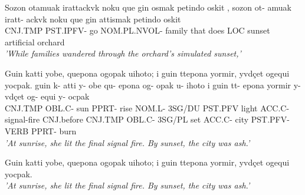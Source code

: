 \documentclass[11pt]{article}
\begin{document}
\begin{exe}
  \ex \label{ex:catwindow}
  Sozon otamuak irattackvk noku que gin osmak petindo oskit ,
  \gll
  sozon    ot-       amuak iratt-      ackvk  noku que  gin attismak  petindo    oskit\\
  CNJ.TMP PST.IPFV- go    NOM.PL.NVOL- family that does LOC sunset artificial orchard\\
  \trans
    \textit{'While families wandered through the orchard’s simulated sunset,'}\\
\end{exe}

\begin{exe}
  \ex \label{ex:warI}
  Guin katti yobe, quepona ogopak uihoto; i guin ttepona yormir, yvdçet ogequi yocpak.
  \gll
  guin    k-     atti y-    obe qu-    epona  og-     opak u-   ihoto       i          
  guin    tt-    epona  yormir y-     vdçet og-      equi y-    ocpak\\
  CNJ.TMP OBL.C- sun  PPRT- rise NOM.L- 3SG/DU PST.PFV light ACC.C- signal-fire CNJ.before 
  CNJ.TMP OBL.C- 3SG/PL set    ACC.C- city  PST.PFV- VERB PPRT- burn\\
  \trans
    \textit{'At sunrise, she lit the final signal fire. By sunset, the city was ash.'}\\
\end{exe}

\begin{exe}
  \ex \label{ex:warI-beau}
  \Huge{}Guin katti yobe, quepona ogopak uihoto; i guin ttepona yormir, yvdçet ogequi yocpak.\\
  \Huge\color{primary}\textserifthin{}\textit{'At sunrise, she lit the final signal fire. By sunset, the city was ash.'}\\
\end{exe}

\newpage

\printglosses
\end{document}
